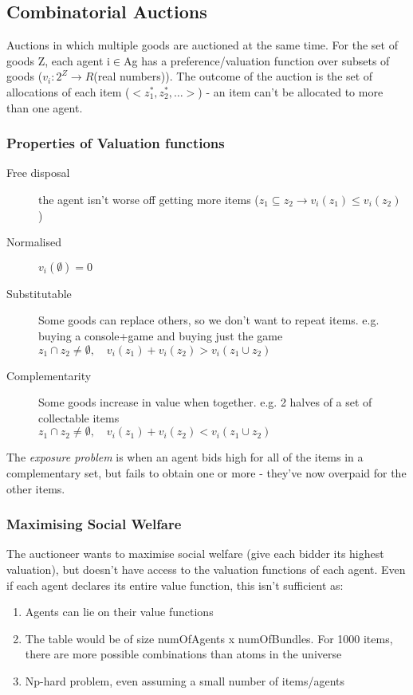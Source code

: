 \subsection{Combinatorial Auctions}
Auctions in which multiple goods are auctioned at the same time. For the set of goods Z, each agent i$\in$Ag has a preference/valuation function over subsets of goods ($v_i: 2^Z\rightarrow{R}$(real numbers)). The outcome of the auction is the set of allocations of each item (${<z^*_1,z^*_2,\dots>}$) - an item can't be allocated to more than one agent. 

\subsubsection{Properties of Valuation functions}
\begin{description}
    \item[Free disposal] the agent isn't worse off getting more items ($z_1\subseteq z_2\rightarrow v_i(z_1) \leq v_i(z_2)$ )
    \item[Normalised] $v_i(\emptyset )=0$
    \item[Substitutable] Some goods can replace others, so we don't want to repeat items. e.g. buying a console+game and buying just the game \\ \qquad \qquad $z_1 \cap z_2 \neq \emptyset ,\quad v_i(z_1) + v_i(z_2) > v_i(z_1 \cup z_2)$
    \item[Complementarity] Some goods increase in value when together. e.g. 2 halves of a set of collectable items
    \\ \qquad \qquad $z_1 \cap z_2 \neq \emptyset ,\quad v_i(z_1) + v_i(z_2) < v_i(z_1 \cup z_2)$
\end{description}
The \emph{exposure problem} is when an agent bids high for all of the items in a complementary set, but fails to obtain one or more - they've now overpaid for the other items. 

\subsubsection{Maximising Social Welfare}
The auctioneer wants to maximise social welfare (give each bidder its highest valuation), but doesn't have access to the valuation functions of each agent. Even if each agent declares its entire value function, this isn't sufficient as:
\begin{enumerate}
    \item Agents can lie on their value functions
    \item The table would be of size numOfAgents x numOfBundles. For 1000 items, there are more possible combinations than atoms in the universe
    \item Np-hard problem, even assuming a small number of items/agents
\end{enumerate}


